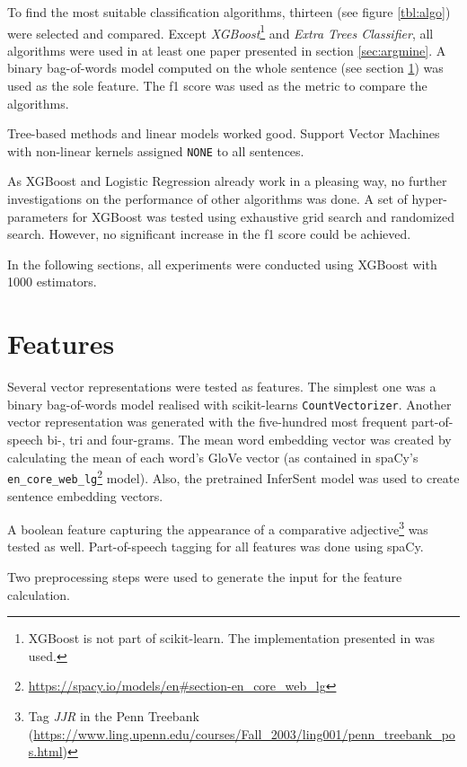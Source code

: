 To find the most suitable classification algorithms, thirteen (see figure \ref{tbl:algo}) were selected and compared. Except \emph{XGBoost}\footnote{XGBoost is not part of scikit-learn. The implementation presented in \cite{DBLP:journals/corr/ChenG16} was used.} and \emph{Extra Trees Classifier}, all algorithms were used in at least one paper presented in section \ref{sec:argmine}. A binary bag-of-words model computed on the whole sentence (see section \ref{sec:features}) was used as the sole feature. The f1 score was used as the metric to compare the algorithms. 

Tree-based methods and linear models worked good. Support Vector Machines with non-linear kernels assigned \texttt{NONE} to all sentences.

As XGBoost and Logistic Regression already work in a pleasing way, no further investigations on the performance of other algorithms was done. A set of hyper-parameters for XGBoost was tested using exhaustive grid search and randomized search. However, no significant increase in the f1 score could be achieved.

In the following sections, all experiments were conducted using XGBoost with 1000 estimators.


\section{Features}
\label{sec:features}
Several vector representations were tested as features. The simplest one was a binary bag-of-words model realised with scikit-learns \texttt{CountVectorizer}. Another vector representation was generated with the five-hundred most frequent part-of-speech bi-, tri and four-grams. The mean word embedding vector was created by calculating the mean of each word's GloVe vector (as contained in spaCy's \texttt{en\_core\_web\_lg}\footnote{\url{https://spacy.io/models/en\#section-en\_core\_web\_lg}} model). Also, the pretrained InferSent model was used to create sentence embedding vectors.

A boolean feature capturing the appearance of a comparative adjective\footnote{Tag \emph{JJR} in the Penn Treebank (\url{https://www.ling.upenn.edu/courses/Fall\_2003/ling001/penn\_treebank\_pos.html})} was tested as well. Part-of-speech tagging for all features was done using spaCy.

Two preprocessing steps were used to generate the input for the feature calculation.

